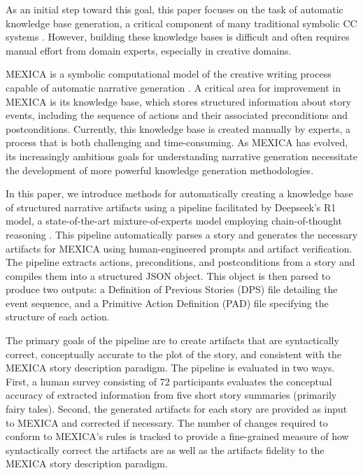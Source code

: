 \documentclass[phd,electronic,oneside,twosidetoc,letterpaper,chaptercenter,parttop,lof]{byumsphd}
\begin{document}
As an initial step toward this goal, this paper focuses on the task of automatic knowledge base generation, a critical component of many traditional symbolic CC systems \cite{ventura2017howto}. However, building these knowledge bases is difficult and often requires manual effort from domain experts, especially in creative domains.

MEXICA is a symbolic computational model of the creative writing process capable of automatic narrative generation \cite{perez1999mexica,perez2001mexica}. A critical area for improvement in MEXICA is its knowledge base, which stores structured information about story events, including the sequence of actions and their associated preconditions and postconditions. Currently, this knowledge base is created manually by experts, a process that is both challenging and time-consuming. As MEXICA has evolved, its increasingly ambitious goals for understanding narrative generation necessitate the development of more powerful knowledge generation methodologies.

In this paper, we introduce methods for automatically creating a knowledge base of structured narrative artifacts \cite{VallsVargas2017TowardsAE,chambers-jurafsky-2008-unsupervised} using a pipeline facilitated by Deepseek's R1 model, a state-of-the-art mixture-of-experts model employing chain-of-thought reasoning \cite{deepseek2025r1}. This pipeline automatically parses a story and generates the necessary artifacts for MEXICA using human-engineered prompts and artifact verification. The pipeline extracts actions, preconditions, and postconditions from a story and compiles them into a structured JSON object. This object is then parsed to produce two outputs: a Definition of Previous Stories (DPS) file detailing the event sequence, and a Primitive Action Definition (PAD) file specifying the structure of each action.

The primary goals of the pipeline are to create artifacts that are syntactically correct, conceptually accurate to the plot of the story, and consistent with the MEXICA story description paradigm. The pipeline is evaluated in two ways. First, a human survey consisting of 72 participants evaluates the conceptual accuracy of extracted information from five short story summaries (primarily fairy tales). Second, the generated artifacts for each story are provided as input to MEXICA and corrected if necessary. The number of changes required to conform to MEXICA's rules is tracked to provide a fine-grained measure of how syntactically correct the artifacts are as well as the artifacts fidelity to the MEXICA story description paradigm. 
\end{document}
